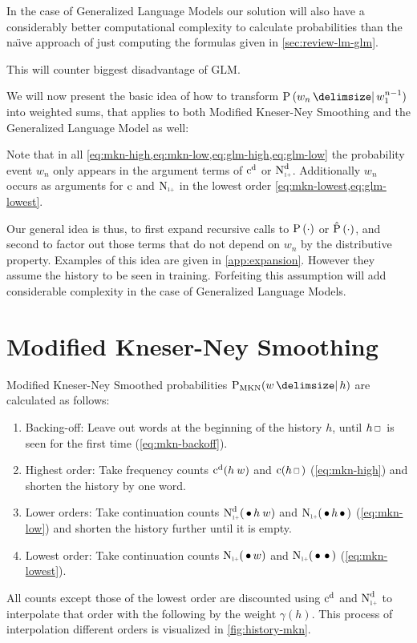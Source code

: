In the case of Generalized Language Models our solution will also have a
considerably better computational complexity to calculate probabilities than the
na{\"\i}ve  approach of just computing
the formulas given in
\cref{sec:review-lm-glm}.
\begin{draft}
This will counter biggest disadvantage of GLM.
\end{draft}

We will now present the basic idea of how to transform $\Prob{w_n}{w_1^{n-1}}$
into weighted sums, that applies to both Modified Kneser-Ney Smoothing and
the Generalized Language Model as well:

Note that in all \cref{eq:mkn-high,eq:mkn-low,eq:glm-high,eq:glm-low} the
probability event $w_n$ only appears in the argument terms of
$\DiscountedCount$ or $\DiscountedCount*$.
Additionally $w_n$ occurs as arguments for $\operatorname{c}$ and $\ContCountIp$ in the
lowest order \cref{eq:mkn-lowest,eq:glm-lowest}.

Our general idea is thus, to first expand recursive calls to
$\Prob(\DummyArg)$ or $\Prob*(\DummyArg)$, and second to factor
out those terms that do not depend on $w_n$ by the distributive property.
Examples of this idea are given in \cref{app:expansion}.
However they assume the history to be seen in training.
Forfeiting this assumption will add considerable complexity in the case
of Generalized Language Models.

\clearpage %
\section{Modified Kneser-Ney Smoothing}

Modified Kneser-Ney Smoothed probabilities $\ProbMKN{w}{h}$ are calculated as
follows:
\begin{enumerate}
  \item Backing-off: Leave out words at the beginning of the history $h$, until
    $h \Skp$ is seen for the first time (\cref{eq:mkn-backoff}).
  \item Highest order: Take frequency counts $\DiscountedCount(h \: w)$ and
    $\Count(h \Skp)$ (\cref{eq:mkn-high}) and shorten the history by one word.
  \item Lower orders: Take continuation counts $\DiscountedCount*(\WSkp h \: w)$
    and $\ContCountIp(\WSkp h \WSkp)$ (\cref{eq:mkn-low}) and shorten the
    history further until it is empty.
  \item Lowest order: Take continuation counts $\ContCountIp(\WSkp w)$ and
    $\ContCountIp(\WSkp \WSkp)$ (\cref{eq:mkn-lowest}).
\end{enumerate}
All counts except those of the lowest order are discounted using
$\DiscountedCount$ and $\DiscountedCount*$ to interpolate that order with the
following by the weight $\gamma(h)$.
This process of interpolation different orders is visualized in
\cref{fig:history-mkn}.

